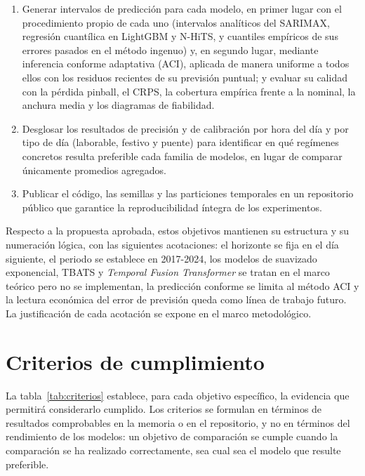 \begin{enumerate}
	\item[\textbf{OE7.}] Generar intervalos de predicción para cada modelo, en
	primer lugar con el procedimiento propio de cada uno (intervalos analíticos
	del SARIMAX, regresión cuantílica en LightGBM y N-HiTS, y cuantiles empíricos
	de sus errores pasados en el método ingenuo) y, en segundo lugar, mediante
	inferencia conforme adaptativa (ACI), aplicada de manera uniforme a todos
	ellos con los residuos recientes de su previsión puntual; y evaluar su calidad con la pérdida pinball, el CRPS,
	la cobertura empírica frente a la nominal, la anchura media y los diagramas
	de fiabilidad.
	
	\item[\textbf{OE8.}] Desglosar los resultados de precisión y de calibración
	por hora del día y por tipo de día (laborable, festivo y puente) para
	identificar en qué regímenes concretos resulta preferible cada familia de
	modelos, en lugar de comparar únicamente promedios agregados.
	
	\item[\textbf{OE9.}] Publicar el código, las semillas y las particiones
	temporales en un repositorio público que garantice la reproducibilidad
	íntegra de los experimentos.
	
\end{enumerate}

Respecto a la propuesta aprobada, estos objetivos mantienen su estructura y
su numeración lógica, con las siguientes acotaciones: el horizonte se fija
en el día siguiente, el periodo se establece en 2017-2024, los modelos de
suavizado exponencial, TBATS y \textit{Temporal Fusion Transformer} se tratan
en el marco teórico pero no se implementan, la predicción conforme se
limita al método ACI y la lectura económica del error de previsión queda como
línea de trabajo futuro. La justificación de cada acotación se expone en el
marco metodológico.

\section{Criterios de cumplimiento}\label{sec:criterios}

La tabla~\ref{tab:criterios} establece, para cada objetivo específico, la
evidencia que permitirá considerarlo cumplido. Los criterios se formulan en
términos de resultados comprobables en la memoria o en el repositorio, y no
en términos del rendimiento de los modelos: un objetivo de comparación se
cumple cuando la comparación se ha realizado correctamente, sea cual sea el
modelo que resulte preferible.

